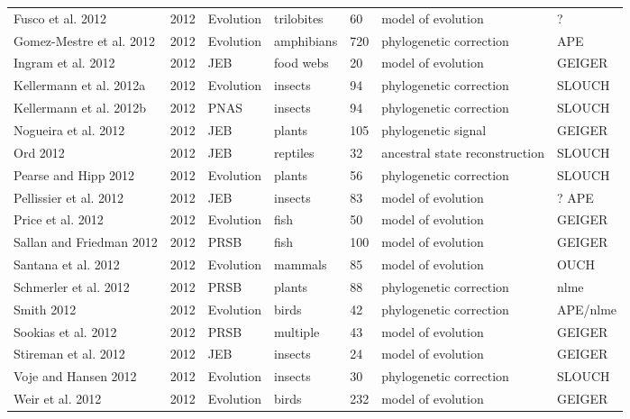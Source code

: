 \begin{landscape}
\begin{center}
\begin{longtable}{p{6cm}llllll}
Fusco et al. 2012 &   2012    &   Evolution   &   trilobites  &   60  &   model of evolution  &   ?   \\
Gomez-Mestre et al. 2012  &   2012    &   Evolution   &   amphibians  &   720 &   phylogenetic correction &   APE \\
Ingram et al. 2012    &   2012    &   JEB &   food webs   &   20  &   model of evolution  &   GEIGER  \\
Kellermann et al. 2012a   &   2012    &   Evolution   &   insects &   94  &   phylogenetic correction &   SLOUCH  \\
Kellermann et al. 2012b   &   2012    &   PNAS    &   insects &   94  &   phylogenetic correction &   SLOUCH  \\
Nogueira et al. 2012  &   2012    &   JEB &   plants  &   105 &   phylogenetic signal &   GEIGER  \\
Ord 2012  &   2012    &   JEB &   reptiles    &   32  &   ancestral state reconstruction  &   SLOUCH  \\
Pearse and Hipp 2012  &   2012    &   Evolution   &   plants  &   56  &   phylogenetic correction &   SLOUCH  \\
Pellissier et al. 2012    &   2012    &   JEB &   insects &   83  &   model of evolution  &   ? APE \\
Price et al. 2012 &   2012    &   Evolution   &   fish    &   50  &   model of evolution  &   GEIGER  \\
Sallan and Friedman 2012  &   2012    &   PRSB    &   fish    &   100 &   model of evolution  &   GEIGER  \\
Santana et al. 2012   &   2012    &   Evolution   &   mammals &   85  &   model of evolution  &   OUCH    \\
Schmerler et al. 2012 &   2012    &   PRSB    &   plants  &   88  &   phylogenetic correction &   nlme    \\
Smith 2012    &   2012    &   Evolution   &   birds   &   42  &   phylogenetic correction &   APE/nlme    \\
Sookias et al. 2012   &   2012    &   PRSB    &   multiple    &   43  &   model of evolution  &   GEIGER  \\
Stireman et al. 2012  &   2012    &   JEB &   insects &   24  &   model of evolution  &   GEIGER  \\
Voje and Hansen 2012  &   2012    &   Evolution   &   insects &   30  &   phylogenetic correction &   SLOUCH  \\
Weir et al. 2012  &   2012    &   Evolution   &   birds   &   232 &   model of evolution  &   GEIGER  \\

\end{longtable}
\end{center}
\end{landscape}
